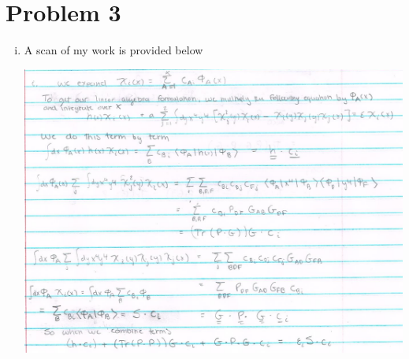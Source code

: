 \documentclass{article}
\begin{document}
\section*{Problem 3}
\begin{enumerate}[i)]
  \item A scan of my work is provided below
    \begin{center}
      \includegraphics[scale=0.5]{prob3part1-1}


\end{center}
\end{enumerate}
\end{document}
